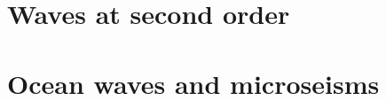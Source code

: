 \documentclass[a4paper]{book}  %
\begin{document}
\chapter{Waves at second order}\label{chnl2}

\cleardoublepage
%
\chapter{Ocean waves and microseisms}\label{chsismo}

\cleardoublepage
%
% 
%
%
%

\appendix
\end{document}
